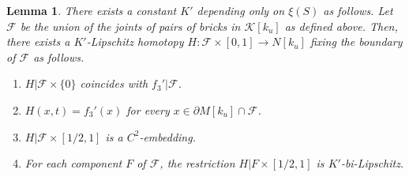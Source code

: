 \documentclass{amsart}
\newtheorem{lemma}[theorem]{Lemma}
\theoremstyle{definition}
\numberwithin{figure}{section}
\numberwithin{equation}{section}
\def\ck{\mathcal{K}}
\begin{document}
\begin{lemma}
\label{uniformly homotoped}
There exists a constant  $K'$ depending only on $\xi(S)$ as follows.
Let $\mathcal F$ be the union of the joints of pairs of bricks in $\ck[k_u]$ as defined above.
Then, there exists a $K'$-Lipschitz homotopy $H: \mathcal{F} \times [0,1] \rightarrow N[k_u]$ fixing the boundary of $\mathcal F$ as follows.
\begin{enumerate}[\rm(i)]
\item  $H|\mathcal F \times \{0\}$ coincides with $f_3'|\mathcal F$.
\item $H(x,t)=f_3'(x)$ for every $x \in \partial M[k_u]\cap \mathcal F$.
\item $H|\mathcal F \times [1/2,1]$ is a  $C^2$-embedding.
\item For each component $F$ of $\mathcal F$, the restriction $H| F \times [1/2,1]$ is $K'$-bi-Lipschitz.
\end{enumerate}
\end{lemma}
\end{document}
